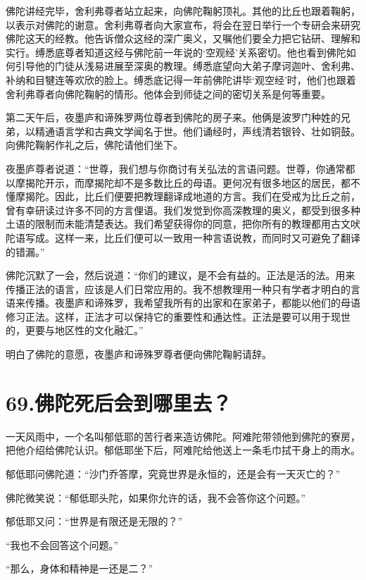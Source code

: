 \documentclass[12pt,twoside,openany]{book}
\begin{document}
佛陀讲经完毕，舍利弗尊者站立起来，向佛陀鞠躬顶礼。其他的比丘也跟着鞠躬，以表示对佛陀的谢意。舍利弗尊者向大家宣布，将会在翌日举行一个专研会来研究佛陀这天的经教。他告诉僧众这经的深广奥义，又嘱他们要全力把它钻研、理解和实行。缚悉底尊者知道这经与佛陀前一年说的‘空观经’关系密切。他也看到佛陀如何引导他的门徒从浅易进展至深奥的教理。缚悉底望向大弟子摩诃迦叶、舍利弗、补纳和目犍连等欢欣的脸上。缚悉底记得一年前佛陀讲毕‘观空经’时，他们也跟着舍利弗尊者向佛陀鞠躬的情形。他体会到师徒之间的密切关系是何等重要。

第二天午后，夜墨庐和谛殊罗两位尊者到佛陀的房子来。他俩是波罗门种姓的兄弟，以精通语言学和古典文学闻名于世。他们诵经时，声线清若银铃、壮如铜鼓。向佛陀鞠躬作礼之后，佛陀请他们坐下。

夜墨庐尊者说道：“世尊，我们想与你商讨有关弘法的言语问题。世尊，你通常都以摩揭陀开示，而摩揭陀却不是多数比丘的母语。更何况有很多地区的居民，都不懂摩揭陀。因此，比丘们便要把教理翻译成地道的方言。我们在受戒为比丘之前，曾有幸研读过许多不同的方言俚语。我们发觉到你高深教理的奥义，都受到很多种土语的限制而未能清楚表达。我们希望获得你的同意，把你所有的教理都用古文吠陀语写成。这样一来，比丘们便可以一致用一种言语说教，而同时又可避免了翻译的错漏。”

佛陀沉默了一会，然后说道：“你们的建议，是不会有益的。正法是活的法。用来传播正法的语言，应该是人们日常应用的。我不想教理用一种只有学者才明白的言语来传播。夜墨庐和谛殊罗，我希望我所有的出家和在家弟子，都能以他们的母语修习正法。这样，正法才可以保持它的重要性和通达性。正法是要可以用于现世的，更要与地区性的文化融汇。”

明白了佛陀的意愿，夜墨庐和谛殊罗尊者便向佛陀鞠躬请辞。


\chapter{69.佛陀死后会到哪里去？}\label{ch69}

一天风雨中，一个名叫郁低耶的苦行者来造访佛陀。阿难陀带领他到佛陀的寮房，把他介绍给佛陀认识。郁低耶坐下后，阿难陀给他送上一条毛巾拭干身上的雨水。

郁低耶问佛陀道：“沙门乔答摩，究竟世界是永恒的，还是会有一天灭亡的？”

佛陀微笑说：“郁低耶头陀，如果你允许的话，我不会答你这个问题。”

郁低耶又问：“世界是有限还是无限的？”

“我也不会回答这个问题。”

“那么，身体和精神是一还是二？”
\end{document}
